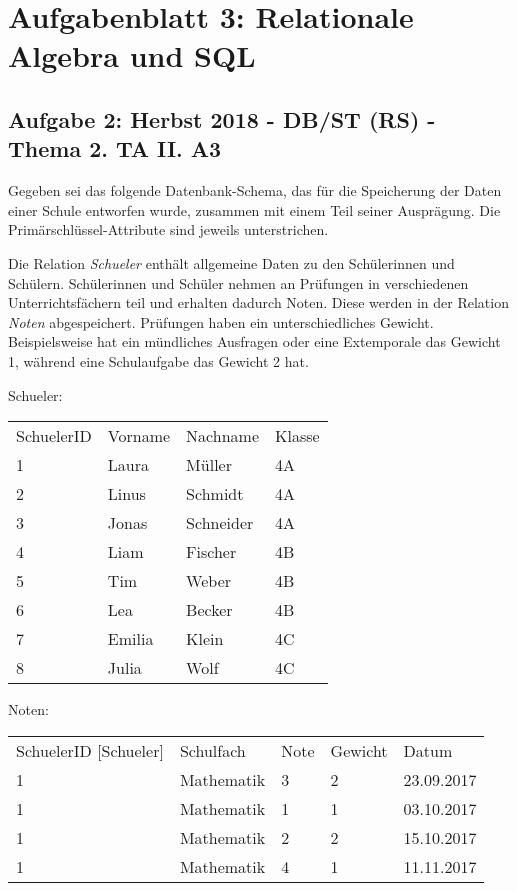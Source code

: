 \documentclass{lehramt-informatik}
\begin{document}
\chapter{Aufgabenblatt 3: Relationale Algebra und SQL}

%


%

\section{Aufgabe 2: Herbst 2018 - DB/ST (RS) - Thema 2. TA II. A3}

Gegeben sei das folgende Datenbank-Schema, das für die Speicherung der
Daten einer Schule entworfen wurde, zusammen mit einem Teil seiner
Ausprägung. Die Primärschlüssel-Attribute sind jeweils unterstrichen.

Die Relation \emph{Schueler} enthält allgemeine Daten zu den
Schülerinnen und Schülern. Schülerinnen und Schüler nehmen an Prüfungen
in verschiedenen Unterrichtsfächern teil und erhalten dadurch Noten.
Diese werden in der Relation \emph{Noten} abgespeichert. Prüfungen haben
ein unterschiedliches Gewicht. Beispielsweise hat ein mündliches
Ausfragen oder eine Extemporale das Gewicht 1, während eine Schulaufgabe
das Gewicht 2 hat.

Schueler:

\begin{tabular}{llll}
SchuelerID & Vorname & Nachname  & Klasse \\
1        & Laura   & Müller    & 4A     \\
2        & Linus   & Schmidt   & 4A     \\
3        & Jonas   & Schneider & 4A     \\
4        & Liam    & Fischer   & 4B     \\
5        & Tim     & Weber     & 4B     \\
6        & Lea     & Becker    & 4B     \\
7        & Emilia  & Klein     & 4C     \\
8        & Julia   & Wolf      & 4C
\end{tabular}

Noten:

\begin{tabular}{lllll}
SchuelerID {[}Schueler{]} & Schulfach  & Note & Gewicht & Datum      \\
1                         & Mathematik & 3    & 2       & 23.09.2017 \\
1                         & Mathematik & 1    & 1       & 03.10.2017 \\
1                         & Mathematik & 2    & 2       & 15.10.2017 \\
1                         & Mathematik & 4    & 1       & 11.11.2017
\end{tabular}
\end{document}
